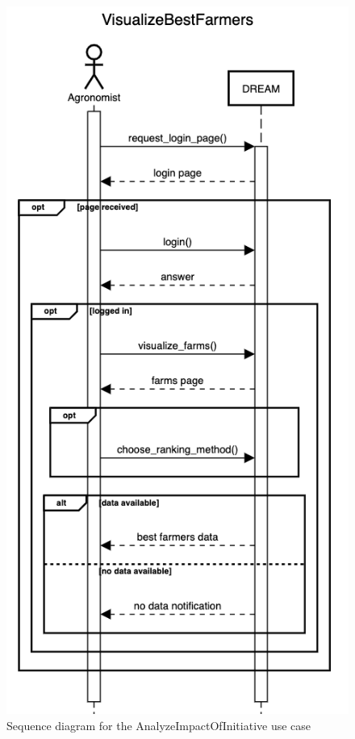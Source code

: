 \documentclass{article}
\begin{document}
\begin{figure}[H]
    \centering
	\includegraphics[scale=0.5]{sequence_diagrams/VisualizeBestFarmers}
    \caption{Sequence diagram for the AnalyzeImpactOfInitiative use case}
\end{figure}
\end{document}
